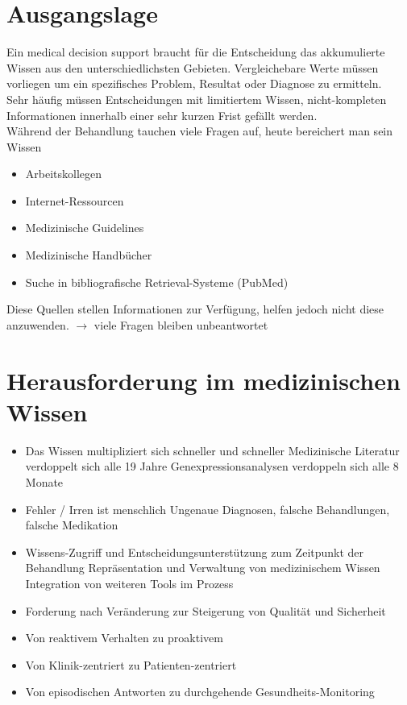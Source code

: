 \documentclass{report}
\theoremstyle{definition}
\theoremstyle{example}
\begin{document}
\section{Ausgangslage}
Ein medical decision support braucht für die Entscheidung das akkumulierte Wissen aus den unterschiedlichsten Gebieten. Vergleichebare Werte müssen vorliegen um ein spezifisches Problem, Resultat oder Diagnose zu ermitteln.\\
Sehr häufig müssen Entscheidungen mit limitiertem Wissen, nicht-kompleten Informationen innerhalb einer sehr kurzen Frist gefällt werden.\\
Während der Behandlung tauchen viele Fragen auf, heute bereichert man sein Wissen
\begin{itemize}
   \item Arbeitskollegen
   \item Internet-Ressourcen
   \item Medizinische Guidelines
   \item Medizinische Handbücher
   \item Suche in bibliografische Retrieval-Systeme (PubMed)
\end{itemize}
Diese Quellen stellen Informationen zur Verfügung, helfen jedoch nicht diese anzuwenden. $\rightarrow$ viele Fragen bleiben unbeantwortet

\section{Herausforderung im medizinischen Wissen}
\begin{itemize}
   \item Das Wissen multipliziert sich schneller und schneller
   \subitem Medizinische Literatur verdoppelt sich alle 19 Jahre
   \subitem Genexpressionsanalysen verdoppeln sich alle 8 Monate
   \item Fehler / Irren ist menschlich
   \subitem Ungenaue Diagnosen, falsche Behandlungen, falsche Medikation
   \item Wissens-Zugriff und Entscheidungsunterstützung zum Zeitpunkt der Behandlung
   \subitem Repräsentation und Verwaltung von medizinischem Wissen
   \subitem Integration von weiteren Tools im Prozess
   \item Forderung nach Veränderung zur Steigerung von Qualität und Sicherheit
   \item Von reaktivem Verhalten zu proaktivem
   \item Von Klinik-zentriert zu Patienten-zentriert
   \item Von episodischen Antworten zu durchgehende Gesundheits-Monitoring
\end{itemize}
\end{document}
